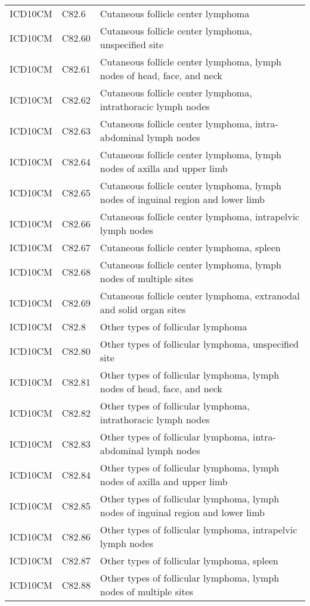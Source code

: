 \begin{table}[ht]
\begin{tabular}{lll}
  ICD10CM & C82.6 & Cutaneous follicle center lymphoma \\ 
  ICD10CM & C82.60 & Cutaneous follicle center lymphoma, unspecified site \\ 
  ICD10CM & C82.61 & Cutaneous follicle center lymphoma, lymph nodes of head, face, and neck \\ 
  ICD10CM & C82.62 & Cutaneous follicle center lymphoma, intrathoracic lymph nodes \\ 
  ICD10CM & C82.63 & Cutaneous follicle center lymphoma, intra-abdominal lymph nodes \\ 
  ICD10CM & C82.64 & Cutaneous follicle center lymphoma, lymph nodes of axilla and upper limb \\ 
  ICD10CM & C82.65 & Cutaneous follicle center lymphoma, lymph nodes of inguinal region and lower limb \\ 
  ICD10CM & C82.66 & Cutaneous follicle center lymphoma, intrapelvic lymph nodes \\ 
  ICD10CM & C82.67 & Cutaneous follicle center lymphoma, spleen \\ 
  ICD10CM & C82.68 & Cutaneous follicle center lymphoma, lymph nodes of multiple sites \\ 
  ICD10CM & C82.69 & Cutaneous follicle center lymphoma, extranodal and solid organ sites \\ 
  ICD10CM & C82.8 & Other types of follicular lymphoma \\ 
  ICD10CM & C82.80 & Other types of follicular lymphoma, unspecified site \\ 
  ICD10CM & C82.81 & Other types of follicular lymphoma, lymph nodes of head, face, and neck \\ 
  ICD10CM & C82.82 & Other types of follicular lymphoma, intrathoracic lymph nodes \\ 
  ICD10CM & C82.83 & Other types of follicular lymphoma, intra-abdominal lymph nodes \\ 
  ICD10CM & C82.84 & Other types of follicular lymphoma, lymph nodes of axilla and upper limb \\ 
  ICD10CM & C82.85 & Other types of follicular lymphoma, lymph nodes of inguinal region and lower limb \\ 
  ICD10CM & C82.86 & Other types of follicular lymphoma, intrapelvic lymph nodes \\ 
  ICD10CM & C82.87 & Other types of follicular lymphoma, spleen \\ 
  ICD10CM & C82.88 & Other types of follicular lymphoma, lymph nodes of multiple sites \\ 

\end{tabular}
\end{table}
